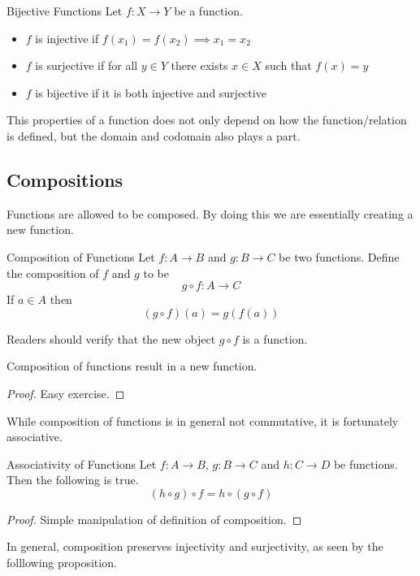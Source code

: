 \begin{defn}{Bijective Functions}{} Let $f:X\to Y$ be a function. 
\begin{itemize}
\item $f$ is injective if $f(x_1)=f(x_2)\implies x_1=x_2$
\item $f$ is surjective if for all $y\in Y$ there exists $x\in X$ such that $f(x)=y$
\item $f$ is bijective if it is both injective and surjective
\end{itemize}
\end{defn}

This properties of a function does not only depend on how the function/relation is defined, but the domain and codomain also plays a part. 

\subsection{Compositions}
Functions are allowed to be composed. By doing this we are essentially creating a new function. 
\begin{defn}{Composition of Functions}{} Let $f:A\to B$ and $g:B\to C$ be two functions. Define the composition of $f$ and $g$ to be $$g\circ f:A\to C$$ If $a\in A$ then $$(g\circ f)(a)=g(f(a))$$
\end{defn}

Readers should verify that the new object $g\circ f$ is a function. 

\begin{lmm}{}{} Composition of functions result in a new function. \tcbline
\begin{proof}
Easy exercise. 
\end{proof}
\end{lmm}

While composition of functions is in general not commutative, it is fortunately associative. 

\begin{prp}{Associativity of Functions}{} Let $f:A\to B$, $g:B\to C$ and $h:C\to D$ be functions. Then the following is true. $$(h\circ g)\circ f=h\circ(g\circ f)$$\tcbline
\begin{proof}
Simple manipulation of definition of composition. 
\end{proof}
\end{prp}

In general, composition preserves injectivity and surjectivity, as seen by the folllowing proposition. 

